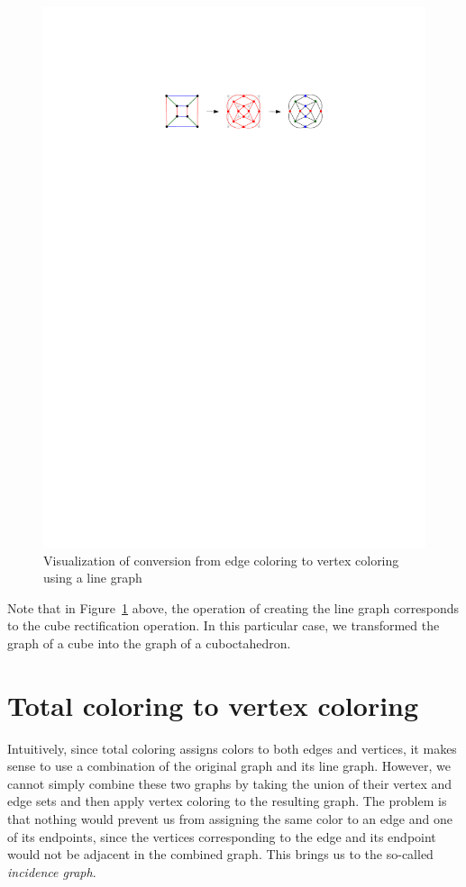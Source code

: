 \begin{figure}[H]
    \centering
    \includegraphics[width=1\textwidth]{../Resources/Figs/cubical_line_graph.pdf}
    \caption{Visualization of conversion from edge coloring to vertex coloring using a line graph}
    \label{fig:cubical_line_graph}
\end{figure}

Note that in Figure~\ref{fig:cubical_line_graph} above, the operation of creating the line graph corresponds to the cube rectification operation. In this particular case, we transformed the graph of a cube into the graph of a cuboctahedron.

\section{Total coloring to vertex coloring}

Intuitively, since total coloring assigns colors to both edges and vertices, it makes sense to use a combination of the original graph and its line graph. However, we cannot simply combine these two graphs by taking the union of their vertex and edge sets and then apply vertex coloring to the resulting graph. The problem is that nothing would prevent us from assigning the same color to an edge and one of its endpoints, since the vertices corresponding to the edge and its endpoint would not be adjacent in the combined graph. This brings us to the so-called \textit{incidence graph}.

